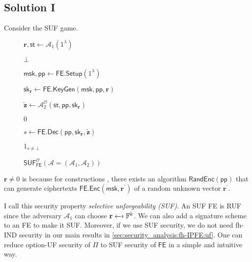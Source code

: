 \subsection{Solution I}
Consider the \textsf{SUF} game.
\begin{figure}[H]
\centering

	\begin{minipage}[t]{0.55\textwidth}
	\begin{algorithm}[H]
	\caption{$\textsf{SUF}^{\mathcal{O}}_{\textsf{FE}}(\mathcal{A} = (\mathcal{A}_1, \mathcal{A}_2))$}
	\begin{algorithmic}[1]
		\State $\mathbf{r}, \textsf{st} \gets \mathcal{A}_1(1^\lambda)$

			\State \Return $\bot$
		\EndIf

		\State $\textsf{msk}, \textsf{pp} \gets \textsf{FE.Setup}(1^\lambda)$

		\State $\textsf{sk}_{\mathbf{r}} \gets \textsf{FE.KeyGen}(\textsf{msk}, \textsf{pp}, \mathbf{r})$

		\State $\mathbf{\tilde{z}} \gets \mathcal{A}_2^{\mathcal{O}} ( \textsf{st}, \textsf{pp}, \textsf{sk}_{\mathbf{r}} )$

			
			\State \Return $0$
		
		\EndIf

		\State $s \gets \textsf{FE.Dec}(\textsf{pp}, \textsf{sk}_{\mathbf{r}}, \mathbf{\tilde{z}} )$

		\State \Return $1_{s \neq \bot}$
	\end{algorithmic}
	\end{algorithm}
	\end{minipage}

\end{figure}

$\mathbf{r} \neq 0$ is because for constructions \cite{10.1007/978-3-319-45871-7_24, cryptoeprint:2016/440}, there exists an algorithm $\textsf{RandEnc}(\textsf{pp})$ that can generate ciphertexts $\textsf{FE.Enc}(\textsf{msk}, \mathbf{r}^\prime)$ of a random unknown vector $\mathbf{r}^\prime$.

I call this security property \emph{selective unforgeability (SUF)}. An SUF \textsf{FE} is RUF since the adversary $\mathcal{A}_1$ can choose $\mathbf{r} \getsdollar \mathbb{F}^k$. We can also add a signature scheme to an \textsf{FE} to make it SUF. Moreover, if we use SUF security, we do not need fh-IND security in our main results in \ref{sec:security_analysis:fh-IPFE:uf}. One can reduce \textsf{option}-UF security of $\Pi$ to SUF security of $\textsf{FE}$ in a simple and intuitive way.

